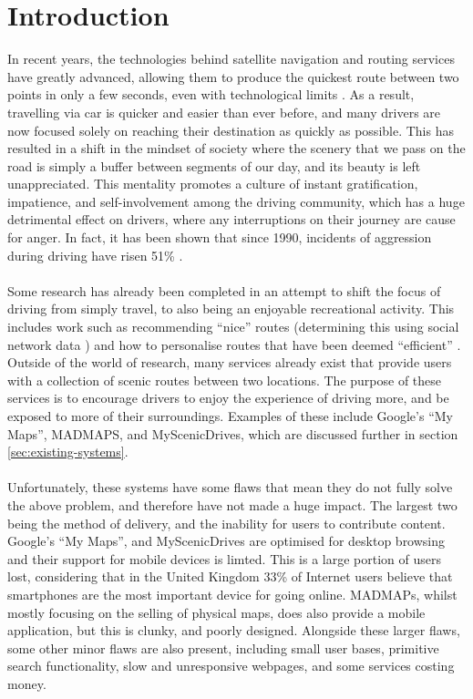 \section{Introduction}
\label{sec:intro}
In recent years, the technologies behind satellite navigation and routing services have greatly advanced, allowing them to produce the quickest route between two points in only a few seconds, even with technological limits \cite{lou2009map}. As a result, travelling via car is quicker and easier than ever before, and many drivers are now focused solely on reaching their destination as quickly as possible. This has resulted in a shift in the mindset of society where the scenery that we pass on the road is simply a buffer between segments of our day, and its beauty is left unappreciated. This mentality promotes a culture of instant gratification, impatience, and self-involvement among the driving community, which has a huge detrimental effect on drivers, where any interruptions on their journey are cause for anger. In fact, it has been shown that since 1990, incidents of aggression during driving have risen 51\% \cite{vest1997road}. \ \\
\ \\
Some research has already been completed in an attempt to shift the focus of driving from simply travel, to also being an enjoyable recreational activity. This includes work such as recommending ``nice'' routes (determining this using social network data \cite{peregrino2012mapping}\cite{van2011time}\cite{quercia2014shortest}) and how to personalise routes that have been deemed ``efficient'' \cite{chen2011discovering}. Outside of the world of research, many services already exist that provide users with a collection of scenic routes between two locations. The purpose of these services is to encourage drivers to enjoy the experience of driving more, and be exposed to more of their surroundings. Examples of these include Google's ``My Maps''\cite{url2015gmaps}, MADMAPS\cite{url2015madmaps}, and MyScenicDrives\cite{url2015myscenicdrives}, which are discussed further in section \ref{sec:existing-systems}.\ \\
\ \\
Unfortunately, these systems have some flaws that mean they do not fully solve the above problem, and therefore have not made a huge impact. The largest two being the method of delivery, and the inability for users to contribute content. Google's ``My Maps'', and MyScenicDrives are optimised for desktop browsing and their support for mobile devices is limted. This is a large portion of users lost, considering that in the United Kingdom 33\% of Internet users believe that smartphones are the most important device for going online\cite{ofcom2015comms}. MADMAPs, whilst mostly focusing on the selling of physical maps, does also provide a mobile application, but this is clunky, and poorly designed. Alongside these larger flaws, some other minor flaws are also present, including small user bases, primitive search functionality, slow and unresponsive webpages, and some services costing money.\ \\

